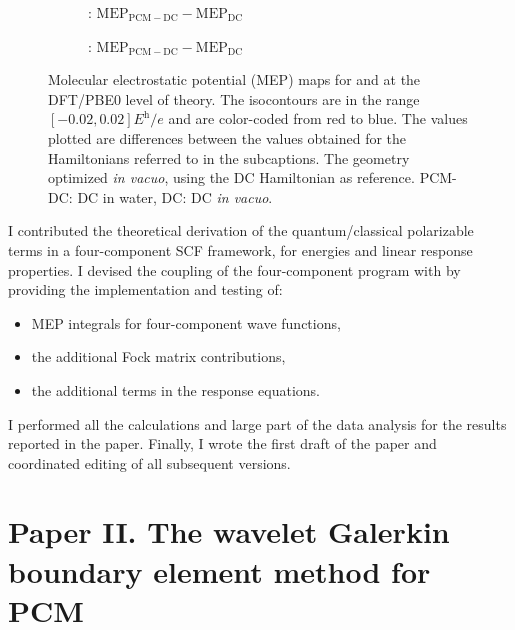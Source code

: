 \begin{figure}
\centering
\begin{subfigure}[b]{0.5\textwidth}
\caption{: $\mathrm{MEP}_\mathrm{PCM-DC} - \mathrm{MEP}_\mathrm{DC}$}
\label{fig:H2Odiff_pcmdc-dc}
\end{subfigure}%
\begin{subfigure}[b]{0.5\textwidth}
\caption{: $\mathrm{MEP}_\mathrm{PCM-DC} - \mathrm{MEP}_\mathrm{DC}$}
\label{fig:H2Podiff_pcmdc-dc}
\end{subfigure}
\caption{
  Molecular electrostatic potential (\acs{MEP}) maps for  and  at
  the \acs{DFT}/PBE0 level of theory.
  The isocontours are in the range $[-0.02, 0.02] \si{\hartree\per\elementarycharge}$ and are
  color-coded from red to blue.
  The values plotted are differences between the values obtained for the
  Hamiltonians referred to in the subcaptions. The geometry optimized \emph{in
  vacuo}, using the \acl{DC} Hamiltonian as reference.
  \acs{PCM}-\acs{DC}: \acl{DC} in water, \acs{DC}: \acl{DC} \emph{in vacuo}.}
\label{fig:MEP_maps}
\end{figure}

I contributed the theoretical derivation of the quantum/classical polarizable
terms in a four-component \acs{SCF} framework, for energies and linear response
properties. I devised the coupling of the four-component program \DIRAC with
\pcmsolver by providing the implementation and testing of:
\begin{itemize}
  \item \acs{MEP} integrals for four-component wave functions,
  \item the additional Fock matrix contributions,
  \item the additional terms in the response equations.
\end{itemize}
I performed all the calculations and large part of the data analysis
for the results reported in the paper.
Finally, I wrote the first draft of the paper and coordinated editing of
all subsequent versions.

\section*{Paper II. The wavelet Galerkin boundary element method for PCM}


